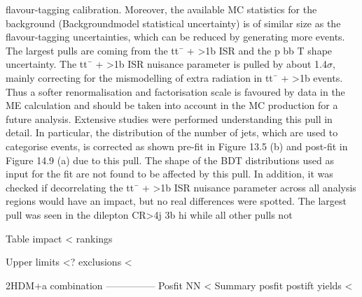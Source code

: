 flavour-tagging calibration. Moreover, the available MC statistics for the background (Backgroundmodel statistical uncertainty) is of similar size as the flavour-tagging uncertainties, which can be
reduced by generating more events. The largest pulls are coming from the tt¯ + >1b ISR and the p
bb
T
shape uncertainty. The tt¯ + >1b
ISR nuisance parameter is pulled by about 1.4$\sigma$, mainly correcting for the mismodelling of extra radiation in tt¯ + >1b events. Thus a softer renormalisation and factorisation scale is favoured by data in
the ME calculation and should be taken into account in the MC production for a future analysis. Extensive studies were performed understanding this pull in detail. In particular, the distribution of the
number of jets, which are used to categorise events, is corrected as shown pre-fit in Figure 13.5 (b)
and post-fit in Figure 14.9 (a) due to this pull. The shape of the BDT distributions used as input
for the fit are not found to be affected by this pull. In addition, it was checked if decorrelating the
tt¯ + >1b ISR nuisance parameter across all analysis regions would have an impact, but no real differences were spotted. The largest pull was seen in the dilepton CR>4j
3b hi while all other pulls not

Table impact < 
rankings

Upper limits <? 
exclusions <

2HDM+a combination
---------------
Posfit NN <
Summary posfit
postift yields < 